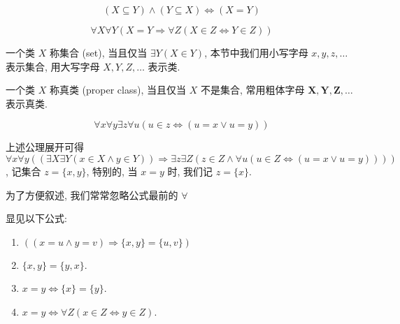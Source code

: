 \begin{corollary}
    \[
        (X \subseteq Y) \land (Y \subseteq X) \Leftrightarrow (X = Y)
    \]
\end{corollary}

\begin{axiom*}
    \label {axiom:NBG Axiom of Equality}
    \[
        \forall X \forall Y (X = Y \Rightarrow \forall Z (X \in Z \Leftrightarrow Y \in Z))
    \]
\end{axiom*}

\begin{definition*}[集合]
    一个类 \(X\) 称集合 (set), 当且仅当 \(\exists Y (X \in Y)\), 本节中我们用小写字母 \(x, y, z, \dots\) 表示集合, 用大写字母 \(X, Y, Z, \dots\) 表示类.
\end{definition*}

\begin{definition*}[真类]
    一个类 \(X\) 称真类 (proper class), 当且仅当 \(X\) 不是集合, 常用粗体字母 \(\mathbf{X}, \mathbf{Y}, \mathbf{Z}, \dots\) 表示真类.
\end{definition*}

\begin{axiom*}
    \label {axiom:NBG Axiom of Pair}
    \[
        \forall x \forall y \exists z \forall u (u \in z \Leftrightarrow (u = x \lor u = y))
    \]
\end{axiom*}

上述公理展开可得 \(\forall x \forall y ((\exists X \exists Y (x \in X \land y \in Y)) \Rightarrow \exists z \exists Z (z \in Z \land \forall u (u \in Z \Leftrightarrow (u = x \lor u = y))))\),
记集合 \(z = \{x,y\}\), 特别的, 当 \(x = y\) 时, 我们记 \(z = \{x\}\).

为了方便叙述, 我们常常忽略公式最前的 \(\forall\)

\begin{corollary}
    显见以下公式:

    \begin{enumerate}
        \item \(((x = u \land y = v) \Rightarrow \{x,y\} = \{u,v\})\)
        \item \(\{x,y\} = \{y,x\}\).
        \item \(x = y \Leftrightarrow \{x\} = \{y\}\).
        \item \(x = y \Leftrightarrow \forall Z (x \in Z \Leftrightarrow y \in Z)\).
    \end{enumerate}
\end{corollary}

